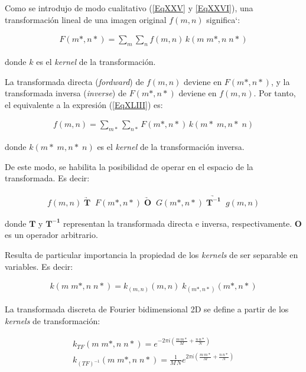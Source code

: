 Como se introdujo de modo cualitativo (\ref{EqXXV} y \ref{EqXXVI}), una transformaci\'on lineal de una imagen original $f(m, n)$ significa`:

\begin{eqnarray}
	F (m*, n*) = \sum _{m} \sum _{n} f(m, n) \, k(m \; m*, n \; n*)
\label{EqXLIII}
\end{eqnarray}

donde $k$ es el \textit{kernel} de la transformaci\'on.
%

%
La transformada directa (\textit{fordward}) de $f(m, n)$ deviene en $F(m*, n*)$, y la transformada inversa (\textit{inverse}) de $F(m*, n*)$ deviene en
$f(m, n)$. Por tanto, el equivalente a la expresi\'on (\ref{EqXLIII}) es:
%

\begin{eqnarray}
	f (m, n) = \sum _{m*} \sum _{n*} F(m*, n*) \, k(m* \; m, n* \; n)
\label{EqXLIV}
\end{eqnarray}

donde $k(m* \; m, n* \; n)$ es el \textit{kernel} de la transformaci\'on inversa.
%

%
De este modo, se habilita la posibilidad de operar en el espacio de la transformada. Es decir:

\begin{eqnarray}
	f (m, n) \; \underrightarrow{\mathbf{T}} \; \; F(m*, n*) \; \underrightarrow{\mathbf{O}} \; \; G(m*, n*) \;
	\underrightarrow{\mathbf{T^{-1}}} \; \; g(m, n)
\label{EqXLV}
\end{eqnarray}


donde $\mathbf{T}$ y $\mathbf{T^{-1}}$ representan la transformada directa e inversa, respectivamente. $\mathbf{O}$ es un operador arbitrario.
%

%
Resulta de particular importancia la propiedad de los \textit{kernels} de ser separable en variables. Es decir:

\begin{eqnarray}
	k (m \; m*, n \; n*) = k_{(m, n)} (m, n) \;  k_{(m*, n*)} (m*, n*)
\label{EqXLVI}
\end{eqnarray}


La transformada discreta de Fourier bidimensional 2D se define a partir de los \textit{kernels} de transformaci\'on:

\begin{eqnarray}
	k_{TF} (m \; m*, n \; n*) = e^{-2 \pi i \left( \frac{m \, m*}{M} + \frac{n \, n*}{N}\right)} \nonumber \\
	k_{(TF)^{-1}} (m \; m*, n \; n*) = \frac{1}{M \, N}e^{2 \pi i \left( \frac{m \, m*}{M} + \frac{n \, n*}{N}\right)}
\label{EqXLVII}
\end{eqnarray}

